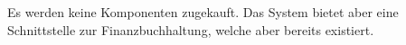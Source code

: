 \documentclass[../../Pflichtenheft.tex]{subfiles}
\begin{document}
    Es werden keine Komponenten zugekauft. Das System bietet aber eine Schnittstelle zur Finanzbuchhaltung, welche aber bereits existiert.
\end{document}
